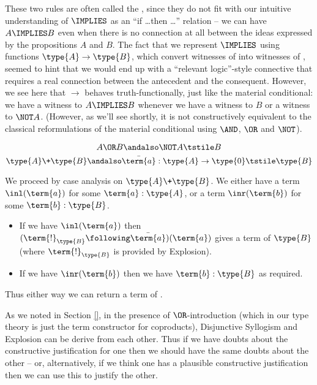 These two rules are often called the , since they do not fit with our intuitive understanding of $\IMPLIES$ as an ``if \ldots then \ldots'' relation -- we can have $A \IMPLIES B$ even when there is no connection at all between the ideas expressed by the propositions $A$ and $B$.  The fact that we represent $\IMPLIES$ using functions $\type{A} \to \type{B}$, which convert witnesses of  into witnesses of , seemed to hint that we would end up with a ``relevant logic''-style connective that requires a real connection between the antecedent and the consequent.  However, we see here that $\to$ behaves truth-functionally, just like the material conditional: we have a witness to $A \IMPLIES B$ whenever we have a witness to $B$ or a witness to $\NOT A$.  (However, as we'll see shortly, it is not constructively equivalent to the classical reformulations of the material conditional using $\AND$, $\OR$ and $\NOT$).








\begin{Theorem}
\[
A \OR B\andalso
\NOT A
\tstile
B
\]
\[
\type{A} \+ \type{B}\andalso
\bar{\term{a}}:\type{A} \to \type{0}
\tstile
\type{B}
\]
\end{Theorem}
\begin{Proof}
We proceed by case analysis on $\type{A} \+ \type{B}$.  We either have a term $\inl(\term{a})$ for some $\term{a}:\type{A}$, 
or a term $\inr(\term{b})$ for some $\term{b}:\type{B}$.
\begin{itemize}
\item If we have $\inl(\term{a})$ then 
$(\term{!}_{\type{B}} \following \bar{\term{a}})(\term{a})$ 
gives a term of $\type{B}$ (where $\term{!}_{\type{B}}$ is provided by Explosion).

\item If we have $\inr(\term{b})$ then we have $\term{b}:\type{B}$ as required.
\end{itemize}
Thus either way we can return a term of .
\end{Proof}

As we noted in Section \ref{}, in the presence of $\OR$-introduction (which in our type theory is just the term constructor for coproducts), Disjunctive Syllogism and Explosion can be derive from each other.  Thus if we have doubts about the constructive justification for one then we should have the same doubts about the other -- or, alternatively, if we think one has a plausible constructive justification then we can use this to justify the other.


